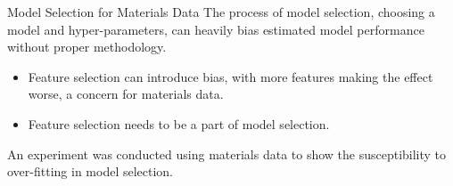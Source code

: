 \documentclass[final]{beamer}
\newlength{\onecolwid}
\begin{document}
\begin{frame}[t]
\begin{columns}[t]
\begin{column}{\onecolwid}
\begin{block}{Model Selection for Materials Data}
The process of model selection, choosing a model and hyper-parameters, can heavily bias estimated model performance without proper methodology. 
\begin{itemize}
    \item Feature selection can introduce bias, with more features making the effect worse, a concern for materials data.
    \item Feature selection needs to be a part of model selection.
\end{itemize}
An experiment was conducted using materials data to show the susceptibility to over-fitting in model selection.
\begin{table}[ht]
  \begin{minipage}[b]{0.6\textwidth}
    \Centering
    \small
    \end{minipage}
  \begin{minipage}[b]{0.39\textwidth}
    \centering

\end{minipage}
\end{table}
\end{block}
\end{column}
\end{columns}
\end{frame}
\end{document}
